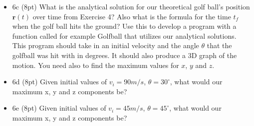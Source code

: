 \documentclass[%
oneside,                 %
final,                   %
10pt]{article}
\begin{document}
\begin{itemize}
\item 6c (8pt) What is the analytical solution for our theoretical golf ball's position $\bm{r}(t)$ over time from Exercise 4?  Also what is the formula for the time $t_f$ when the golf ball hits the ground? Use this to develop a program with a function called for example Golfball that utilizes our analytical solutions. This program should take in an initial velocity and the angle $\theta$ that the golfball was hit with in degrees. It should also produce  a 3D graph of the motion. You need also to find the maximum values for $x$, $y$ and $z$.

\item 6d (8pt) Given initial values of $v_i = 90 m/s$, $\theta = 30^{\circ}$, what would our maximum x, y and z components be? 

\item 6e (8pt) Given initial values of $v_i = 45 m/s$, $\theta = 45^{\circ}$, what would our maximum x, y and z components be? 
\end{itemize}

\noindent

\end{document}
